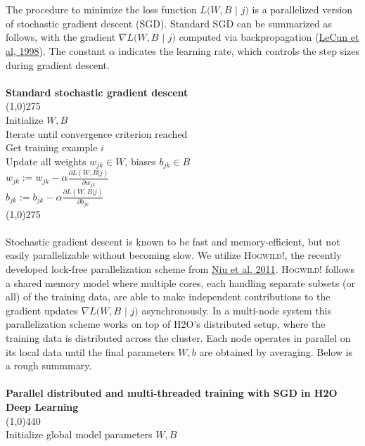 \documentclass[12pt]{article}
\begin{document}
\\
\\
\noindent
The procedure to minimize the loss function $L(W,B$ $|$ $j)$ is a parallelized version of stochastic gradient descent (SGD). Standard SGD can be summarized as follows, with the gradient $\nabla L(W,B$ $|$ $j)$ computed via backpropagation (\href{http://yann.lecun.com/exdb/publis/pdf/lecun-98b.pdf}{LeCun et al, 1998}). The constant $\alpha$ indicates the learning rate, which controls the step sizes during gradient descent.
\\
\\
{\bf{\footnotesize{Standard stochastic gradient descent}}}
\\
\line(1,0){275}
\\
Initialize $W,B$ 
\\
Iterate until convergence criterion reached
\\
\indent Get training example $i$
\\
\indent Update all weights $w_{jk} \in W$, biases $b_{jk} \in B$
\\
\indent \indent $w_{jk} := w_{jk} - \alpha \frac{\partial L(W,B | j)}{\partial w_{jk}}$
\\
\indent \indent $b_{jk} := b_{jk} - \alpha \frac{\partial L(W,B | j)}{\partial b_{jk}}$
\\
\line(1,0){275}
\\
\\
Stochastic gradient descent is known to be fast and memory-efficient, but not easily parallelizable without becoming slow. We utilize \textsc{Hogwild!}, the recently developed lock-free parallelization scheme from \href{http://i.stanford.edu/hazy/papers/hogwild-nips.pdf}{Niu et al, 2011}. \textsc{Hogwild!} follows a shared memory model where multiple cores, each handling separate subsets (or all) of the training data, are able to make independent contributions to the gradient updates $\nabla L(W,B$ $ |$ $j)$ asynchronously. In a multi-node system this parallelization scheme works on top of H2O's distributed setup, where the training data is distributed across the cluster. Each node operates in parallel on its local data until the final parameters $W,b$ are obtained by averaging. Below is a rough summmary.
\\
\\
\noindent
{\bf{\footnotesize{Parallel distributed and multi-threaded training with SGD in H2O Deep Learning}}}
\\
\line(1,0){440}
\\
Initialize global model parameters $W,B$
\end{document}

